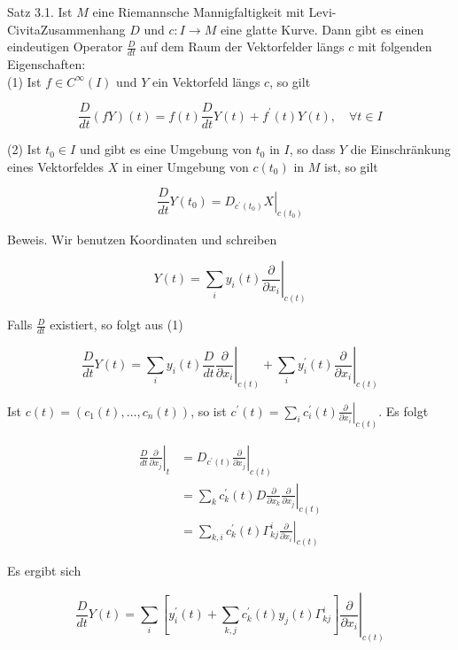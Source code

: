 \documentclass[10pt, letterpaper]{article}
\begin{document}
Satz 3.1. Ist $M$ eine Riemannsche Mannigfaltigkeit mit Levi-CivitaZusammenhang $D$ und $c: I \rightarrow M$ eine glatte Kurve. Dann gibt es einen eindeutigen Operator $\frac{D}{d t}$ auf dem Raum der Vektorfelder längs $c$ mit folgenden Eigenschaften:\\
(1) Ist $f \in C^{\infty}(I)$ und $Y$ ein Vektorfeld längs $c$, so gilt

$$
\frac{D}{d t}(f Y)(t)=f(t) \frac{D}{d t} Y(t)+f^{\prime}(t) Y(t), \quad \forall t \in I
$$

(2) Ist $t_{0} \in I$ und gibt es eine Umgebung von $t_{0}$ in $I$, so dass $Y$ die Einschränkung eines Vektorfeldes $X$ in einer Umgebung von $c\left(t_{0}\right)$ in $M$ ist, so gilt

$$
\frac{D}{d t} Y\left(t_{0}\right)=\left.D_{c^{\prime}\left(t_{0}\right)} X\right|_{c\left(t_{0}\right)}
$$

Beweis. Wir benutzen Koordinaten und schreiben

$$
Y(t)=\left.\sum_{i} y_{i}(t) \frac{\partial}{\partial x_{i}}\right|_{c(t)}
$$

Falls $\frac{D}{d t}$ existiert, so folgt aus (1)

$$
\frac{D}{d t} Y(t)=\left.\sum_{i} y_{i}(t) \frac{D}{d t} \frac{\partial}{\partial x_{i}}\right|_{c(t)}+\left.\sum_{i} y_{i}^{\prime}(t) \frac{\partial}{\partial x_{i}}\right|_{c(t)}
$$

Ist $c(t)=\left(c_{1}(t), \ldots, c_{n}(t)\right)$, so ist $c^{\prime}(t)=\left.\sum_{i} c_{i}^{\prime}(t) \frac{\partial}{\partial x_{i}}\right|_{c(t)}$. Es folgt

$$
\begin{aligned}
\left.\frac{D}{d t} \frac{\partial}{\partial x_{j}}\right|_{t} & =\left.D_{c^{\prime}(t)} \frac{\partial}{\partial x_{j}}\right|_{c(t)} \\
& =\left.\sum_{k} c_{k}^{\prime}(t) D \frac{\partial}{\partial x_{k}} \frac{\partial}{\partial x_{j}}\right|_{c(t)} \\
& =\left.\sum_{k, i} c_{k}^{\prime}(t) \Gamma_{k j}^{i} \frac{\partial}{\partial x_{i}}\right|_{c(t)}
\end{aligned}
$$

Es ergibt sich


\begin{equation*}
\frac{D}{d t} Y(t)=\left.\sum_{i}\left[y_{i}^{\prime}(t)+\sum_{k, j} c_{k}^{\prime}(t) y_{j}(t) \Gamma_{k j}^{i}\right] \frac{\partial}{\partial x_{i}}\right|_{c(t)} \tag{4}
\end{equation*}
\end{document}
